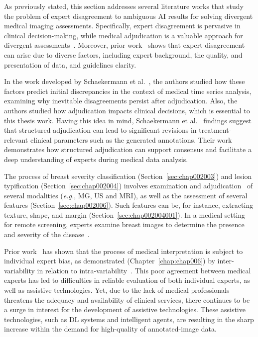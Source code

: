 As previously stated, this section addresses several literature works that study the problem of expert disagreement to ambiguous \ac{AI} results for solving divergent medical imaging assessments.
Specifically, expert disagreement is pervasive in clinical decision-making, while medical adjudication is a valuable approach for divergent assessments~\cite{10.1145/3359178}.
Moreover, prior work~\cite{NIAZI2019e253} shows that expert disagreement can arise due to diverse factors, including expert background, the quality, and presentation of data, and guidelines clarity.

In the work developed by Schaekermann et al.~\cite{10.1145/3359178}, the authors studied how these factors predict initial discrepancies in the context of medical time series analysis, examining why inevitable disagreements persist after adjudication.
Also, the authors studied how adjudication impacts clinical decisions, which is essential to this thesis work.
Having this idea in mind, Schaekermann et al.~\cite{10.1145/3359178} findings suggest that structured adjudication can lead to significant revisions in treatment-relevant clinical parameters such as the generated annotations.
Their work demonstrates how structured adjudication can support consensus and facilitate a deep understanding of experts during medical data analysis.

The process of breast severity classification (Section~\ref{sec:chap002003}) and lesion typification (Section~\ref{sec:chap002004}) involves examination and adjudication~\cite{10.1145/3359178} of several modalities ({\it e.g.}, \ac{MG}, \ac{US} and \ac{MRI}), as well as the assessment of several features (Section~\ref{sec:chap002006}).
Such features can be, for instance, extracting texture, shape, and margin (Section~\ref{sec:chap002004001}).
In a medical setting for remote screening, experts examine breast images to determine the presence and severity of the disease~\cite{10.1145/3399715.3399744}.

Prior work~\cite{MIRANDA2015334} has shown that the process of medical interpretation is subject to individual expert bias, as demonstrated (Chapter~\ref{chap:chap006}) by inter-variability in relation to intra-variability~\cite{NIAZI2019e253}.
This poor agreement between medical experts has led to difficulties in reliable evaluation of both individual experts, as well as assistive technologies.
Yet, due to the lack of medical professionals threatens the adequacy and availability of clinical services, there continues to be a surge in interest for the development of assistive technologies.
These assistive technologies, such as \ac{DL} systems and intelligent agents, are resulting in the sharp increase within the demand for high-quality of annotated-image data.

